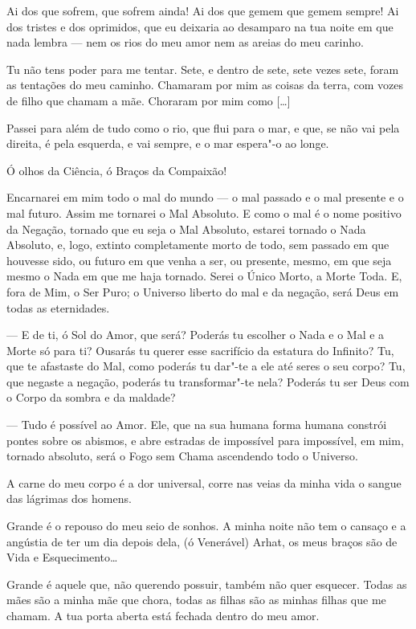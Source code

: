  Ai dos que sofrem, que sofrem ainda! Ai dos que gemem
que gemem sempre! Ai dos tristes e dos oprimidos, que eu deixaria ao
desamparo na tua noite em que nada lembra --- nem os rios do meu amor
nem as areias do meu carinho.

Tu não tens poder para me tentar. Sete, e dentro de sete, sete vezes
sete, foram as tentações do meu caminho. Chamaram por mim as coisas
da terra, com vozes de filho que chamam a mãe. Choraram por mim como
[\ldots{}]

Passei para além de tudo como o rio, que flui para o mar, e que, se
não vai pela direita, é pela esquerda, e vai sempre, e o mar espera"-o
ao longe.

 Ó olhos da Ciência, ó Braços da Compaixão!

Encarnarei em mim todo o mal do mundo --- o mal passado e o mal presente
e o mal futuro. Assim me tornarei o Mal Absoluto. E como o mal é o
nome positivo da Negação, tornado que eu seja o Mal Absoluto, estarei
tornado o Nada Absoluto, e, logo, extinto completamente morto de
todo, sem passado em que houvesse sido, ou futuro em que venha a ser,
ou presente, mesmo, em que seja mesmo o Nada em que me haja tornado.
Serei o Único Morto, a Morte Toda. E, fora de Mim, o Ser Puro; o
Universo liberto do mal e da negação, será Deus em todas as
eternidades.

--- E de ti, ó Sol do Amor, que será? Poderás tu escolher o Nada e o Mal
e a Morte só para ti? Ousarás tu querer esse sacrifício da estatura
do Infinito? Tu, que te afastaste do Mal, como poderás tu dar"-te a
ele até seres o seu corpo? Tu, que negaste a negação, poderás tu
transformar"-te nela? Poderás tu ser Deus com o Corpo da sombra e da
maldade?

--- Tudo é possível ao Amor. Ele, que na sua humana forma humana
constrói pontes sobre os abismos, e abre estradas de impossível para
impossível, em mim, tornado absoluto, será o Fogo sem Chama
ascendendo todo o Universo.

 A carne do meu corpo é a dor universal, corre nas
veias da minha vida o sangue das lágrimas dos homens.

 Grande é o repouso do meu seio de sonhos. A minha noite
não tem o cansaço e a angústia de ter um dia depois dela, (ó
Venerável) Arhat, os meus braços são de Vida e Esquecimento\ldots{}

  Grande é aquele que, não querendo possuir, também não
quer esquecer. Todas as mães são a minha mãe que chora, todas as
filhas são as minhas filhas que me chamam. A tua porta aberta está
fechada dentro do meu amor.

